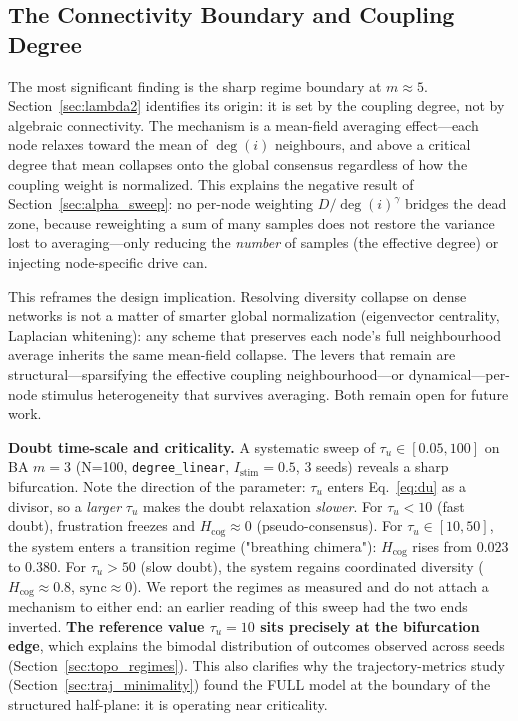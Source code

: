 ﻿\documentclass[11pt]{article}
\begin{document}
\subsection{The Connectivity Boundary and Coupling Degree}

The most significant finding is the sharp regime boundary at $m \approx 5$. Section~\ref{sec:lambda2} identifies its origin: it is set by the coupling degree, not by algebraic connectivity. The mechanism is a mean-field averaging effect---each node relaxes toward the mean of $\deg(i)$ neighbours, and above a critical degree that mean collapses onto the global consensus regardless of how the coupling weight is normalized. This explains the negative result of Section~\ref{sec:alpha_sweep}: no per-node weighting $D/\deg(i)^\gamma$ bridges the dead zone, because reweighting a sum of many samples does not restore the variance lost to averaging---only reducing the \emph{number} of samples (the effective degree) or injecting node-specific drive can.

This reframes the design implication. Resolving diversity collapse on dense networks is not a matter of smarter global normalization (eigenvector centrality, Laplacian whitening): any scheme that preserves each node's full neighbourhood average inherits the same mean-field collapse. The levers that remain are structural---sparsifying the effective coupling neighbourhood---or dynamical---per-node stimulus heterogeneity that survives averaging. Both remain open for future work.

\textbf{Doubt time-scale and criticality.} A systematic sweep of $\tau_u \in [0.05, 100]$ on BA $m=3$ (N=100, \texttt{degree\_linear}, $I_{\mathrm{stim}}=0.5$, 3 seeds) reveals a sharp bifurcation. Note the direction of the parameter: $\tau_u$ enters Eq.~\ref{eq:du} as a divisor, so a \emph{larger} $\tau_u$ makes the doubt relaxation \emph{slower}. For $\tau_u < 10$ (fast doubt), frustration freezes and $H_{\mathrm{cog}} \approx 0$ (pseudo-consensus). For $\tau_u \in [10, 50]$, the system enters a transition regime ("breathing chimera"): $H_{\mathrm{cog}}$ rises from $0.023$ to $0.380$. For $\tau_u > 50$ (slow doubt), the system regains coordinated diversity ($H_{\mathrm{cog}} \approx 0.8$, $\mathrm{sync} \approx 0$). We report the regimes as measured and do not attach a mechanism to either end: an earlier reading of this sweep had the two ends inverted. \textbf{The reference value $\tau_u = 10$ sits precisely at the bifurcation edge}, which explains the bimodal distribution of outcomes observed across seeds (Section~\ref{sec:topo_regimes}). This also clarifies why the trajectory-metrics study (Section~\ref{sec:traj_minimality}) found the FULL model at the boundary of the structured half-plane: it is operating near criticality.
\end{document}

